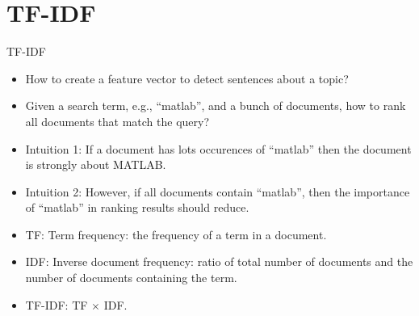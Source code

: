 \documentclass[11pt]{beamer}
\begin{document}
\section{TF-IDF}
\begin{frame}{TF-IDF}
  \begin{itemize}[<+->]
  \item How to create a feature vector to detect sentences about a topic? 
  \item Given a search term, e.g.,  ``matlab'', and a bunch of documents,  how to rank all documents that match the query? 
  \item Intuition 1: If a document has lots occurences of ``matlab'' then the document is strongly about MATLAB. 
  \item Intuition 2: However, if all documents contain ``matlab'',  then the importance of ``matlab'' in ranking results should reduce. 
  \item TF: Term frequency:  the frequency of a term in a document. 
  \item IDF: Inverse document frequency: ratio of total number of documents and the number of documents containing the term. 
  \item TF-IDF: TF $\times$ IDF. 
  \end{itemize}
\end{frame}

 
\end{document}
